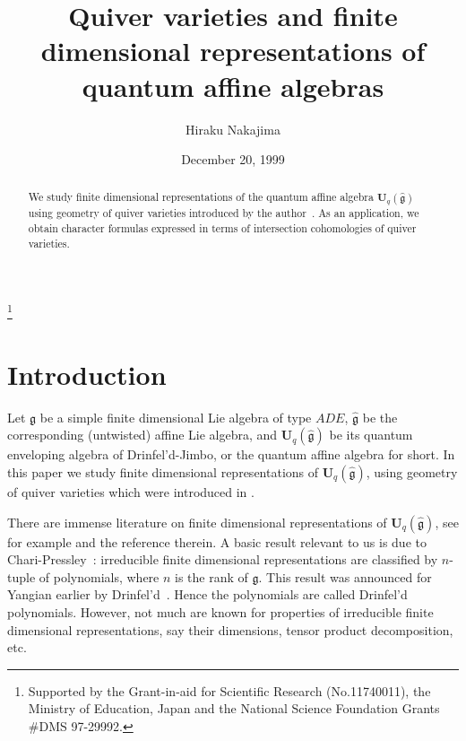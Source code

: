 \documentclass[12pt]{amsart}
\theoremstyle{definition}
\theoremstyle{remark}
\numberwithin{equation}{subsection}
\newcommand{\Ua}{{\mathbf U}_q(\widehat{\mathfrak g})} %
\begin{document}
\author{Hiraku Nakajima}
\title[quiver varieties and quantum affine algebras]
{Quiver varieties and finite dimensional representations of quantum
affine algebras
}
\address{Department of Mathematics, Kyoto University, Kyoto 606-8502,
Japan}
\thanks{Supported by the Grant-in-aid
for Scientific Research (No.11740011), the Ministry of Education,
Japan and the National Science Foundation Grants \#DMS 97-29992.}
%
%
\begin{abstract}
We study finite dimensional representations of the quantum affine
algebra $\Ua$ using geometry of quiver varieties introduced by the
author~\cite{KN,Na-quiver,Na-alg}. As an application, we obtain
character formulas expressed in terms of intersection cohomologies of
quiver varieties.
\end{abstract}

\date{December 20, 1999}
\maketitle

\section*{Introduction}\label{sec:intro}

Let $\mathfrak g$ be a simple finite dimensional Lie algebra of type
$ADE$,
%
$\widehat{\mathfrak g}$ be the corresponding (untwisted)
affine Lie algebra,
%
and $\Ua$ be its quantum enveloping algebra of Drinfel'd-Jimbo, or the
quantum affine algebra for short.
%
In this paper we study finite dimensional representations of $\Ua$,
%
using geometry of quiver varieties which were introduced in
\cite{KN,Na-quiver,Na-alg}.

There are immense literature on finite dimensional representations of
$\Ua$, see for example \cite{AK,CP,FR,Hata,Kl} and the reference
therein.
%
A basic result relevant to us is due to Chari-Pressley~\cite{CP2}:
irreducible finite dimensional representations are classified by
$n$-tuple of polynomials, where $n$ is the rank of $\mathfrak g$. This
result was announced for Yangian earlier by Drinfel'd~\cite{Drinfeld}.
Hence the polynomials are called Drinfel'd polynomials. However, not
much are known for properties of irreducible finite dimensional
representations, say their dimensions, tensor product decomposition,
etc.
\end{document}
